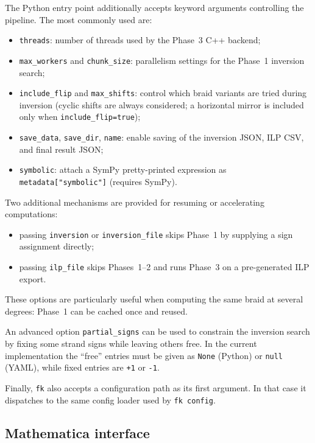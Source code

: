 \documentclass[twocolumn]{article}
\begin{document}
The Python entry point additionally accepts keyword arguments controlling the
pipeline.  The most commonly used are:
\begin{itemize}
  \item \texttt{threads}: number of threads used by the Phase~3 C++ backend;
  \item \texttt{max\_workers} and \texttt{chunk\_size}: parallelism settings for
    the Phase~1 inversion search;
  \item \texttt{include\_flip} and \texttt{max\_shifts}: control which braid
    variants are tried during inversion (cyclic shifts are always considered;
    a horizontal mirror is included only when \texttt{include\_flip=true});
  \item \texttt{save\_data}, \texttt{save\_dir}, \texttt{name}: enable saving of
    the inversion JSON, ILP CSV, and final result JSON;
  \item \texttt{symbolic}: attach a SymPy pretty-printed expression as
    \texttt{metadata["symbolic"]} (requires SymPy).
\end{itemize}

Two additional mechanisms are provided for resuming or accelerating
computations:
\begin{itemize}
  \item passing \texttt{inversion} or \texttt{inversion\_file} skips Phase~1 by
    supplying a sign assignment directly;
  \item passing \texttt{ilp\_file} skips Phases~1--2 and runs Phase~3 on a
    pre-generated ILP export.
\end{itemize}
These options are particularly useful when computing the same braid at several
degrees: Phase~1 can be cached once and reused.

An advanced option \texttt{partial\_signs} can be used to constrain the inversion
search by fixing some strand signs while leaving others free.  In the current
implementation the ``free'' entries must be given as \texttt{None} (Python) or
\texttt{null} (YAML), while fixed entries are \texttt{+1} or \texttt{-1}.

Finally, \texttt{fk} also accepts a configuration path as its first argument.
In that case it dispatches to the same config loader used by \texttt{fk config}.

\subsection{Mathematica interface}
\end{document}
